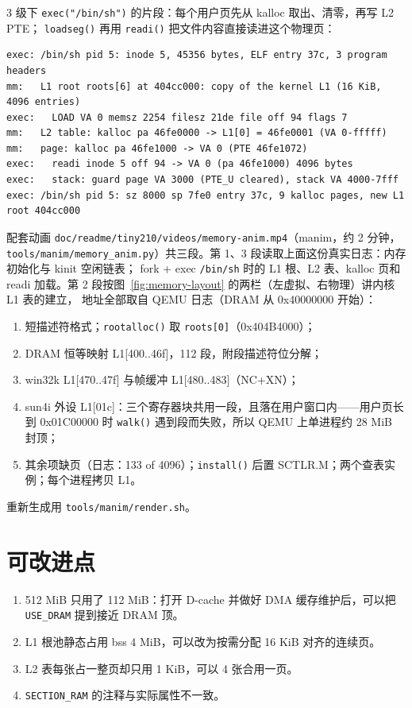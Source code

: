 3 级下 \texttt{exec("/bin/sh")} 的片段：每个用户页先从 kalloc 取出、清零，再写 L2 PTE；
\texttt{loadseg()} 再用 \texttt{readi()} 把文件内容直接读进这个物理页：
\begin{lstlisting}
exec: /bin/sh pid 5: inode 5, 45356 bytes, ELF entry 37c, 3 program headers
mm:   L1 root roots[6] at 404cc000: copy of the kernel L1 (16 KiB, 4096 entries)
exec:   LOAD VA 0 memsz 2254 filesz 21de file off 94 flags 7
mm:   L2 table: kalloc pa 46fe0000 -> L1[0] = 46fe0001 (VA 0-fffff)
mm:   page: kalloc pa 46fe1000 -> VA 0 (PTE 46fe1072)
exec:   readi inode 5 off 94 -> VA 0 (pa 46fe1000) 4096 bytes
exec:   stack: guard page VA 3000 (PTE_U cleared), stack VA 4000-7fff
exec: /bin/sh pid 5: sz 8000 sp 7fe0 entry 37c, 9 kalloc pages, new L1 root 404cc000
\end{lstlisting}

配套动画 \texttt{doc/readme/tiny210/videos/memory-anim.mp4}（manim，约 2 分钟，
\texttt{tools/manim/memory\_anim.py}）共三段。第 1、3 段读取上面这份真实日志：内存初始化与 kinit 空闲链表；
fork + exec \texttt{/bin/sh} 时的 L1 根、L2 表、kalloc 页和 readi 加载。第 2 段按图~\ref{fig:memory-layout} 的两栏（左虚拟、右物理）讲内核 L1 表的建立，
地址全部取自 QEMU 日志（DRAM 从 0x40000000 开始）：
\begin{enumerate}
\item 短描述符格式；\texttt{rootalloc()} 取 \texttt{roots[0]}（0x404B4000）；
\item DRAM 恒等映射 L1[400..46f]，112 段，附段描述符位分解；
\item win32k L1[470..47f] 与帧缓冲 L1[480..483]（NC+XN）；
\item sun4i 外设 L1[01c]：三个寄存器块共用一段，且落在用户窗口内——用户页长到 0x01C00000 时
      \texttt{walk()} 遇到段而失败，所以 QEMU 上单进程约 28 MiB 封顶；
\item 其余项缺页（日志：133 of 4096）；\texttt{install()} 后置 SCTLR.M；两个查表实例；每个进程拷贝 L1。
\end{enumerate}
重新生成用 \texttt{tools/manim/render.sh}。

\section{可改进点}

\begin{enumerate}
\item 512 MiB 只用了 112 MiB：打开 D-cache 并做好 DMA 缓存维护后，可以把 \texttt{USE\_DRAM} 提到接近 DRAM 顶。
\item L1 根池静态占用 bss 4 MiB，可以改为按需分配 16 KiB 对齐的连续页。
\item L2 表每张占一整页却只用 1 KiB，可以 4 张合用一页。
\item \texttt{SECTION\_RAM} 的注释与实际属性不一致。
\end{enumerate}
